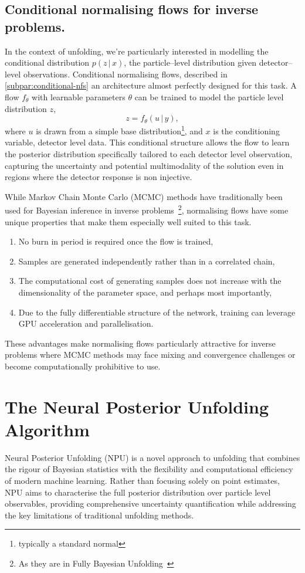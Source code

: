 \subsection{Conditional normalising flows for inverse problems.}
    In the context of unfolding, we're particularly interested in modelling the conditional distribution $p(z\,|\,x)$, the particle--level distribution given detector--level observations.
    Conditional normalising flows, described in \cref{subpar:conditional-nfs} an architecture almost perfectly designed for this task.
    A flow \(f_\theta\) with learnable parameters \(\theta\) can be trained to model the particle level distribution \(z\),
    \[
        z = f_\theta(u\,|\,y),
    \]
    where $u$ is drawn from a simple base distribution\footnote{typically a standard normal}, and $x$ is the conditioning variable, detector level data.
    This conditional structure allows the flow to learn the posterior distribution specifically tailored to each detector level observation, capturing the uncertainty and potential multimodality of the solution even in regions where the detector response is non injective.

    While Markov Chain Monte Carlo (MCMC) methods have traditionally been used for Bayesian inference in inverse problems~\cite{Kaipio2005StatisticalProblems, Segura2024APhysics, Dashti2017TheProblems, 2005InverseMeasurements, 2005StatisticalTheory}\footnote{As they are in Fully Bayesian Unfolding~\cite{choudalakis_fully_2012}}, normalising flows have some unique properties that make them especially well suited to this task.
    \begin{enumerate}
        \item  No burn in period is required once the flow is trained,
        \item Samples are generated independently rather than in a correlated chain,
        \item The computational cost of generating samples does not increase with the dimensionality of the parameter space, and perhaps most importantly,
        \item Due to the fully differentiable structure of the network, training can leverage GPU acceleration and parallelisation.
    \end{enumerate}
    
    These advantages make normalising flows particularly attractive for inverse problems where MCMC methods may face mixing and convergence challenges or become computationally prohibitive to use.
\section{The Neural Posterior Unfolding Algorithm}
    Neural Posterior Unfolding (NPU) is a novel approach to unfolding that combines the rigour of Bayesian statistics with the flexibility and computational efficiency of modern machine learning.
    Rather than focusing solely on point estimates, NPU aims to characterise the full posterior distribution over particle level observables, providing comprehensive uncertainty quantification while addressing the key limitations of traditional unfolding methods.

